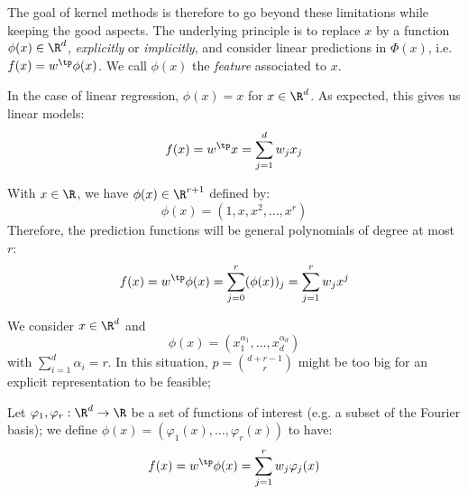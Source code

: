 \documentclass{../cs-classes/cs-classes}
\begin{document}
The goal of kernel methods is therefore to go beyond these limitations while keeping the good aspects. The underlying principle is to replace $x$ by a function $\phi(x)\in\R^d$, \emph{explicitly} or \emph{implicitly}, and consider linear predictions in $\Phi(x)$, i.e.~$f(x)=w^\tp \phi(x)$. We call $\phi(x)$ the \emph{feature} associated to $x$.

\begin{example}
    In the case of linear regression, $\phi(x)=x$ for $x\in\R^d$. As expected, this gives us linear models:
    \begin{equation*}
        f(x)=w^\tp x = \sum_{j=1}^d w_jx_j
    \end{equation*}
\end{example}

\begin{example}
    With $x\in\R$, we have $\phi(x)\in\R^{r+1}$ defined by:
    \begin{equation*}
        \phi(x)=(1, x, x^2, \dots, x^r)
    \end{equation*}
    Therefore, the prediction functions will be general polynomials of degree at most $r$:
    \begin{equation*}
        f(x)=w^\tp\phi(x)=\sum_{j=0}^r (\phi(x))_j = \sum_{j=1}^r w_jx^j
    \end{equation*}
\end{example}

\begin{example}
    We consider $x\in\R^d$ and
    \begin{equation*}
        \phi(x)=(x_1^{\alpha_1}, \dots, x_d^{\alpha_d})
    \end{equation*}
    with $\sum_{i=1}^d \alpha_i=r$. In this situation, $p=\binom{d+r-1}{r}$ might be too big for an explicit representation to be feasible;
\end{example}

\begin{example}
    Let $\varphi_1, \varphi_r : \R^d \to \R$ be a set of functions of interest (e.g. a subset of the Fourier basis); we define $\phi(x) = (\varphi_1(x), \dots, \varphi_r(x))$ to have:
    \begin{equation*}
        f(x)=w^\tp \phi(x) = \sum_{j=1}^rw_j\varphi_j(x)
    \end{equation*}
\end{example}
\end{document}

